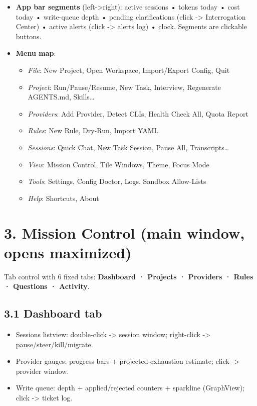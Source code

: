 \documentclass[10pt,a4paper]{article}
\begin{document}
\begin{itemize}
  \item \textbf{App bar segments} (left->right): active sessions • tokens today • cost today •
write-queue depth • pending clarifications (click -> Interrogation Center) • active alerts (click -> alerts log) • clock. Segments are clickable buttons.

  \item \textbf{Menu map}:
  \begin{itemize}
    \item \emph{File}: New Project, Open Workspace, Import/Export Config, Quit
    \item \emph{Project}: Run/Pause/Resume, New Task, Interview, Regenerate AGENTS.md, Skills…
    \item \emph{Providers}: Add Provider, Detect CLIs, Health Check All, Quota Report
    \item \emph{Rules}: New Rule, Dry-Run, Import YAML
    \item \emph{Sessions}: Quick Chat, New Task Session, Pause All, Transcripts…
    \item \emph{View}: Mission Control, Tile Windows, Theme, Focus Mode
    \item \emph{Tools}: Settings, Config Doctor, Logs, Sandbox Allow-Lists
    \item \emph{Help}: Shortcuts, About
  \end{itemize}
\end{itemize}
\section{3. Mission Control (main window, opens maximized)}
Tab control with 6 fixed tabs: \textbf{Dashboard · Projects · Providers · Rules · Questions · Activity}.

\subsection{3.1 Dashboard tab}
\begin{center}

\end{center}

\begin{itemize}
  \item Sessions listview: double-click -> session window; right-click -> pause/steer/kill/migrate.
  \item Provider gauges: progress bars + projected-exhaustion estimate; click -> provider window.
  \item Write queue: depth + applied/rejected counters + sparkline (GraphView); click -> ticket log.
\end{itemize}
\end{document}
